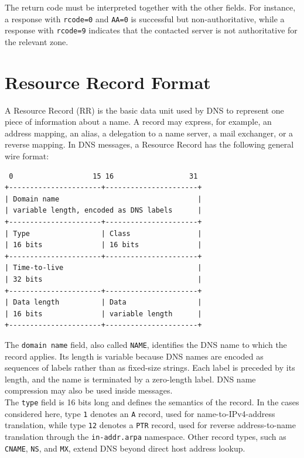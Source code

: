 \documentclass{scrbook}
\begin{document}
	The return code must be interpreted together with the other fields. For instance, a response with \texttt{rcode=0} and \texttt{AA=0} is successful but non-authoritative, while a response with \texttt{rcode=9} indicates that the contacted server is not authoritative for the relevant zone.
	
	\newpage
	\section{Resource Record Format}
	
	A Resource Record (RR) is the basic data unit used by DNS to represent one piece of information about a name. A record may express, for example, an address mapping, an alias, a delegation to a name server, a mail exchanger, or a reverse mapping. In DNS messages, a Resource Record has the following general wire format:
	\begin{lstlisting}
 0                   15 16                  31
+----------------------+----------------------+
| Domain name                                 |
| variable length, encoded as DNS labels      |
+----------------------+----------------------+
| Type                 | Class                |
| 16 bits              | 16 bits              |
+----------------------+----------------------+
| Time-to-live                                |
| 32 bits                                     |
+----------------------+----------------------+
| Data length          | Data                 |
| 16 bits              | variable length      |
+----------------------+----------------------+
	\end{lstlisting}
	
	The \texttt{domain name} field, also called \texttt{NAME}, identifies the DNS name to which the record applies. Its length is variable because DNS names are encoded as sequences of labels rather than as fixed-size strings. Each label is preceded by its length, and the name is terminated by a zero-length label. DNS name compression may also be used inside messages.\\
	
	The \texttt{type} field is 16 bits long and defines the semantics of the record. In the cases considered here, type \texttt{1} denotes an \texttt{A} record, used for name-to-IPv4-address translation, while type \texttt{12} denotes a \texttt{PTR} record, used for reverse address-to-name translation through the \texttt{in-addr.arpa} namespace. Other record types, such as \texttt{CNAME}, \texttt{NS}, and \texttt{MX}, extend DNS beyond direct host address lookup.\\
	
\end{document}
